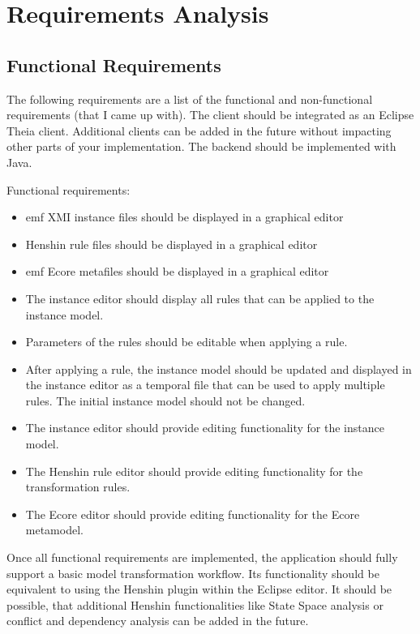   \section{Requirements Analysis}
  \label{subsec:requirements}

  \subsection{Functional Requirements}
  \label{subsec:functional-requirements}

  The following requirements are a list of the functional and non-functional requirements (that I came up with). The client should be integrated as an Eclipse Theia client. Additional clients can be added in the future without impacting other parts of your implementation. \cite{eclipseGLSP} The backend should be implemented with Java.

  Functional requirements:

  \begin{itemize}
  
    \item \ac{emf} XMI instance files should be displayed in a graphical editor
    \item Henshin rule files should be displayed in a graphical editor
    \item \ac{emf} Ecore metafiles should be displayed in a graphical editor
    \item The instance editor should display all rules that can be applied to the instance model.
    \item Parameters of the rules should be editable when applying a rule.
    \item After applying a rule, the instance model should be updated and displayed in the instance editor as a temporal file that can be used to apply multiple rules. The initial instance model should not be changed.
    \item The instance editor should provide editing functionality for the instance model.
    \item The Henshin rule editor should provide editing functionality for the transformation rules.
    \item The Ecore editor should provide editing functionality for the Ecore metamodel.

  \end{itemize}

  Once all functional requirements are implemented, the application should fully support a basic model transformation workflow. Its functionality should be equivalent to using the Henshin plugin within the Eclipse editor. It should be possible, that additional Henshin functionalities like State Space analysis or conflict and dependency analysis can be added in the future.



